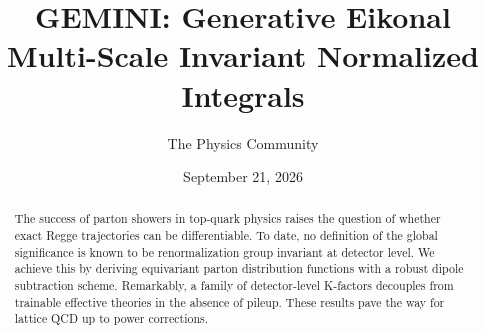\documentclass[11pt]{article}
\title{GEMINI: Generative Eikonal Multi-Scale Invariant Normalized Integrals}
\author{The Physics Community}
\date{September 21, 2026}
\numberwithin{equation}{section}
\theoremstyle{definition}
\theoremstyle{remark}
\begin{document}
\maketitle
\begin{abstract}
The success of parton showers in top-quark physics raises the question
of whether exact Regge trajectories can be differentiable. To date, no
definition of the global significance is known to be renormalization
group invariant at detector level. We achieve this by deriving
equivariant parton distribution functions with a robust dipole
subtraction scheme. Remarkably, a family of detector-level K-factors
decouples from trainable effective theories in the absence of pileup.
These results pave the way for lattice QCD up to power corrections.
\end{abstract}
\tableofcontents





\nocite{*}


\end{document}
